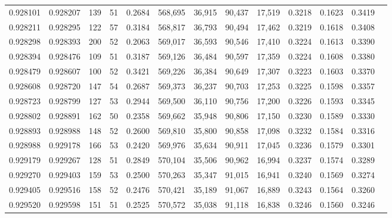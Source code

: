 \begin{tabular}{rrrrrrrrrrrrr}
0.928101 & 0.928207 &   139 &  51 &                                     0.2684 & 568,695 &  36,915 &  90,437 &  17,519 & 0.3218 & 0.1623 & 0.3419 \\
0.928211 & 0.928295 &   122 &  57 &                                     0.3184 & 568,817 &  36,793 &  90,494 &  17,462 & 0.3219 & 0.1618 & 0.3408 \\
0.928298 & 0.928393 &   200 &  52 &                                     0.2063 & 569,017 &  36,593 &  90,546 &  17,410 & 0.3224 & 0.1613 & 0.3390 \\
0.928394 & 0.928476 &   109 &  51 &                                     0.3187 & 569,126 &  36,484 &  90,597 &  17,359 & 0.3224 & 0.1608 & 0.3380 \\
0.928479 & 0.928607 &   100 &  52 &                                     0.3421 & 569,226 &  36,384 &  90,649 &  17,307 & 0.3223 & 0.1603 & 0.3370 \\
0.928608 & 0.928720 &   147 &  54 &                                     0.2687 & 569,373 &  36,237 &  90,703 &  17,253 & 0.3225 & 0.1598 & 0.3357 \\
0.928723 & 0.928799 &   127 &  53 &                                     0.2944 & 569,500 &  36,110 &  90,756 &  17,200 & 0.3226 & 0.1593 & 0.3345 \\
0.928802 & 0.928891 &   162 &  50 &                                     0.2358 & 569,662 &  35,948 &  90,806 &  17,150 & 0.3230 & 0.1589 & 0.3330 \\
0.928893 & 0.928988 &   148 &  52 &                                     0.2600 & 569,810 &  35,800 &  90,858 &  17,098 & 0.3232 & 0.1584 & 0.3316 \\
0.928988 & 0.929178 &   166 &  53 &                                     0.2420 & 569,976 &  35,634 &  90,911 &  17,045 & 0.3236 & 0.1579 & 0.3301 \\
0.929179 & 0.929267 &   128 &  51 &                                     0.2849 & 570,104 &  35,506 &  90,962 &  16,994 & 0.3237 & 0.1574 & 0.3289 \\
0.929270 & 0.929403 &   159 &  53 &                                     0.2500 & 570,263 &  35,347 &  91,015 &  16,941 & 0.3240 & 0.1569 & 0.3274 \\
0.929405 & 0.929516 &   158 &  52 &                                     0.2476 & 570,421 &  35,189 &  91,067 &  16,889 & 0.3243 & 0.1564 & 0.3260 \\
0.929520 & 0.929598 &   151 &  51 &                                     0.2525 & 570,572 &  35,038 &  91,118 &  16,838 & 0.3246 & 0.1560 & 0.3246 \\

\end{tabular}
